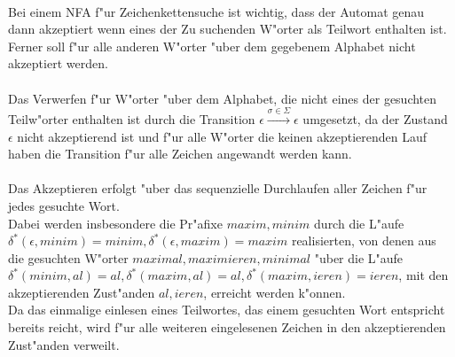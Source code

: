 \documentclass{article}
\newcommand{\eps}{\epsilon}
\newcommand{\rao}[1]{\overset{#1}{\rightarrow}}
\begin{document}
\\
Bei einem NFA f"ur Zeichenkettensuche ist wichtig, dass der Automat genau dann
    akzeptiert wenn eines der Zu suchenden W"orter als Teilwort enthalten ist.\\
Ferner soll f"ur alle anderen W"orter "uber dem gegebenem Alphabet nicht 
    akzeptiert werden.\\
\\
Das Verwerfen f"ur W"orter "uber dem Alphabet, die nicht eines der gesuchten
    Teilw"orter enthalten ist durch die Transition 
    $\eps \rao{\sigma \in \Sigma} \eps$ umgesetzt, da der Zustand $\eps$ nicht
    akzeptierend ist und f"ur alle W"orter die keinen akzeptierenden Lauf haben
    die Transition f"ur alle Zeichen angewandt werden kann.\\
\\
Das Akzeptieren erfolgt "uber das sequenzielle Durchlaufen aller Zeichen f"ur
    jedes gesuchte Wort.\\
Dabei werden insbesondere die Pr"afixe $maxim, minim$ durch die L"aufe
    $\delta^*(\eps, minim) = minim, \delta^*(\eps, maxim) = maxim$ realisierten,
    von denen aus die gesuchten W"orter $maximal, maximieren, minimal$ "uber die
    L"aufe 
    $\delta^*(minim, al) = al,
    \delta^*(maxim, al) = al, 
    \delta^*(maxim, ieren) = ieren$, mit den akzeptierenden Zust"anden 
    $al, ieren$, erreicht werden k"onnen.\\
Da das einmalige einlesen eines Teilwortes, das einem gesuchten Wort entspricht 
    bereits reicht, wird f"ur alle weiteren eingelesenen Zeichen in den 
    akzeptierenden Zust"anden verweilt.\\
\\

\newpage
\end{document}
